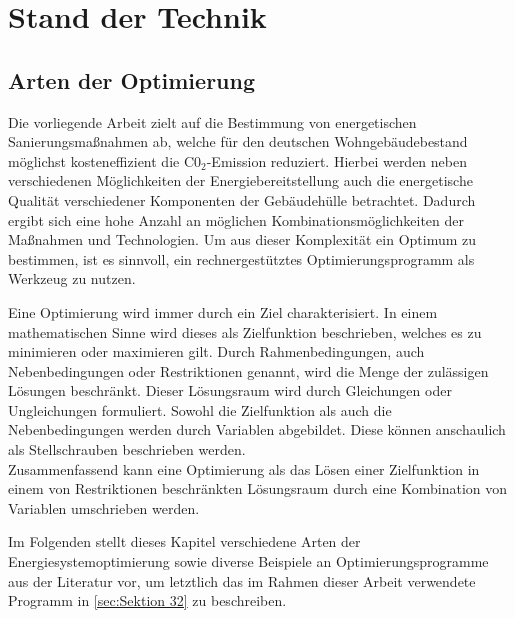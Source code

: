 \chapter{Stand der Technik}


\section{Arten der Optimierung}
\label{sec:Sektion 31}

Die vorliegende Arbeit zielt auf die Bestimmung von energetischen Sanierungsmaßnahmen ab, welche für den deutschen Wohngebäudebestand möglichst kosteneffizient die C0\(_2\)-Emission reduziert.
Hierbei werden neben verschiedenen Möglichkeiten der Energiebereitstellung auch die energetische Qualität verschiedener Komponenten der Gebäudehülle betrachtet.
Dadurch ergibt sich eine hohe Anzahl an möglichen Kombinationsmöglichkeiten der Maßnahmen und Technologien.
Um aus dieser Komplexität ein Optimum zu bestimmen, ist es sinnvoll, ein rechnergestütztes Optimierungsprogramm als Werkzeug zu nutzen.

Eine Optimierung wird immer durch ein Ziel charakterisiert.
In einem mathematischen Sinne wird dieses als Zielfunktion beschrieben, welches es zu minimieren oder maximieren gilt.
Durch Rahmenbedingungen, auch Nebenbedingungen oder Restriktionen genannt, wird die Menge der zulässigen Lösungen beschränkt.
Dieser Lösungsraum wird durch Gleichungen oder Ungleichungen formuliert.
Sowohl die Zielfunktion als auch die Nebenbedingungen werden durch Variablen abgebildet.
Diese können anschaulich als Stellschrauben beschrieben werden.\cite{Schellong.2016}\\
Zusammenfassend kann eine Optimierung als das Lösen einer Zielfunktion in einem von Restriktionen beschränkten Lösungsraum durch eine Kombination von Variablen umschrieben werden. 

Im Folgenden stellt dieses Kapitel verschiedene Arten der Energiesystemoptimierung sowie diverse Beispiele an Optimierungsprogramme aus der Literatur vor, um letztlich das im Rahmen dieser Arbeit verwendete Programm in \ref{sec:Sektion 32} zu beschreiben.

